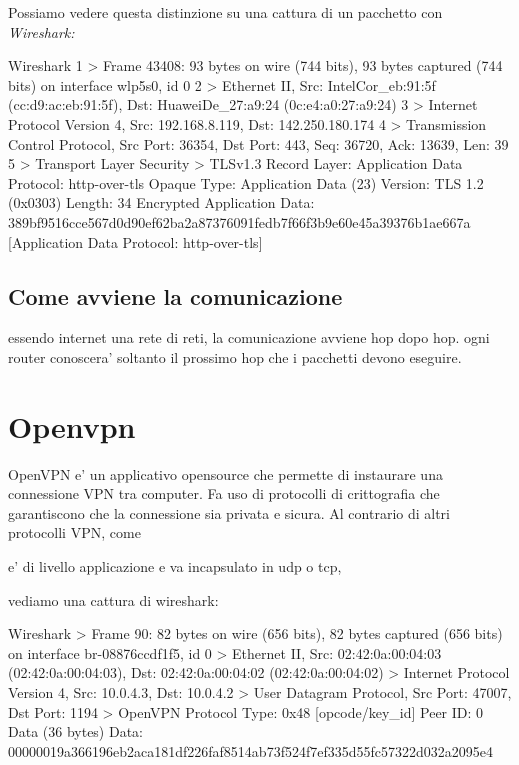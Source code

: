 Possiamo vedere questa distinzione su una cattura di un pacchetto con \it{Wireshark}:

\begin{bashcode}{Wireshark}{}
1 > Frame 43408: 93 bytes on wire (744 bits), 93 bytes captured (744 bits) on interface wlp5s0, id 0
2 > Ethernet II, Src: IntelCor_eb:91:5f (cc:d9:ac:eb:91:5f), Dst: HuaweiDe_27:a9:24 (0c:e4:a0:27:a9:24)
3 > Internet Protocol Version 4, Src: 192.168.8.119, Dst: 142.250.180.174
4 > Transmission Control Protocol, Src Port: 36354, Dst Port: 443, Seq: 36720, Ack: 13639, Len: 39
5 > Transport Layer Security
     > TLSv1.3 Record Layer: Application Data Protocol: http-over-tls
             Opaque Type: Application Data (23)
             Version: TLS 1.2 (0x0303)
             Length: 34
             Encrypted Application Data: 389bf9516cce567d0d90ef62ba2a87376091fedb7f66f3b9e60e45a39376b1ae667a
             [Application Data Protocol: http-over-tls]
\end{bashcode}

\subsection{Come avviene la comunicazione}

essendo internet una rete di reti, la comunicazione avviene hop dopo hop. ogni router conoscera' soltanto il prossimo hop che i pacchetti devono eseguire.




\section{Openvpn}


OpenVPN e' un applicativo opensource che permette di instaurare una connessione VPN tra computer. Fa uso di protocolli di crittografia che garantiscono che la connessione sia privata e sicura.
Al contrario di altri protocolli VPN, come %

e' di livello applicazione e va incapsulato in udp o tcp,

vediamo una cattura di wireshark:

\begin{bashcode}{Wireshark}{}
> Frame 90: 82 bytes on wire (656 bits), 82 bytes captured (656 bits) on interface br-08876ccdf1f5, id 0
> Ethernet II, Src: 02:42:0a:00:04:03 (02:42:0a:00:04:03), Dst: 02:42:0a:00:04:02 (02:42:0a:00:04:02)
> Internet Protocol Version 4, Src: 10.0.4.3, Dst: 10.0.4.2
> User Datagram Protocol, Src Port: 47007, Dst Port: 1194
> OpenVPN Protocol
        Type: 0x48 [opcode/key_id]
        Peer ID: 0
        Data (36 bytes)
            Data: 00000019a366196eb2aca181df226faf8514ab73f524f7ef335d55fc57322d032a2095e4
\end{bashcode}

